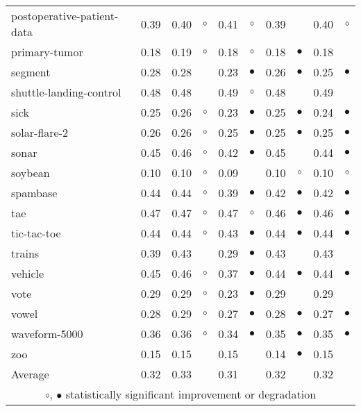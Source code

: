\begin{table}[thb]
{\begin{tabular}{lrr@{\hspace{0.1cm}}cr@{\hspace{0.1cm}}cr@{\hspace{0.1cm}}cr@{\hspace{0.1cm}}c}
postoperative-patient-data & 0.39 & 0.40 &   $\circ$ & 0.41 &   $\circ$ & 0.39 &           & 0.40 &    $\circ$\\
primary-tumor & 0.18 & 0.19 &   $\circ$ & 0.18 &   $\circ$ & 0.18 & $\bullet$ & 0.18 &           \\
segment & 0.28 & 0.28 &           & 0.23 & $\bullet$ & 0.26 & $\bullet$ & 0.25 &  $\bullet$\\
shuttle-landing-control & 0.48 & 0.48 &           & 0.49 &   $\circ$ & 0.48 &           & 0.49 &           \\
sick & 0.25 & 0.26 &   $\circ$ & 0.23 & $\bullet$ & 0.25 & $\bullet$ & 0.24 &  $\bullet$\\
solar-flare-2 & 0.26 & 0.26 &   $\circ$ & 0.25 & $\bullet$ & 0.25 & $\bullet$ & 0.25 &  $\bullet$\\
sonar & 0.45 & 0.46 &   $\circ$ & 0.42 & $\bullet$ & 0.45 &           & 0.44 &  $\bullet$\\
soybean & 0.10 & 0.10 &   $\circ$ & 0.09 &           & 0.10 &   $\circ$ & 0.10 &    $\circ$\\
spambase & 0.44 & 0.44 &   $\circ$ & 0.39 & $\bullet$ & 0.42 & $\bullet$ & 0.42 &  $\bullet$\\
tae & 0.47 & 0.47 &   $\circ$ & 0.47 &   $\circ$ & 0.46 & $\bullet$ & 0.46 &  $\bullet$\\
tic-tac-toe & 0.44 & 0.44 &   $\circ$ & 0.43 & $\bullet$ & 0.44 & $\bullet$ & 0.44 &  $\bullet$\\
trains & 0.39 & 0.43 &           & 0.29 & $\bullet$ & 0.43 &           & 0.43 &           \\
vehicle & 0.45 & 0.46 &   $\circ$ & 0.37 & $\bullet$ & 0.44 & $\bullet$ & 0.44 &  $\bullet$\\
vote & 0.29 & 0.29 &   $\circ$ & 0.23 & $\bullet$ & 0.29 &           & 0.29 &           \\
vowel & 0.28 & 0.29 &   $\circ$ & 0.27 & $\bullet$ & 0.28 & $\bullet$ & 0.27 &  $\bullet$\\
waveform-5000 & 0.36 & 0.36 &   $\circ$ & 0.34 & $\bullet$ & 0.35 & $\bullet$ & 0.35 &  $\bullet$\\
zoo & 0.15 & 0.15 &           & 0.15 &           & 0.14 & $\bullet$ & 0.15 &           \\
\hline
Average & 0.32 & 0.33 &           & 0.31 &           & 0.32 &           & 0.32 &           \\
\hline
\multicolumn{10}{c}{$\circ$, $\bullet$ statistically significant improvement or degradation}\\
\end{tabular} \footnotesize \par}
\end{table}